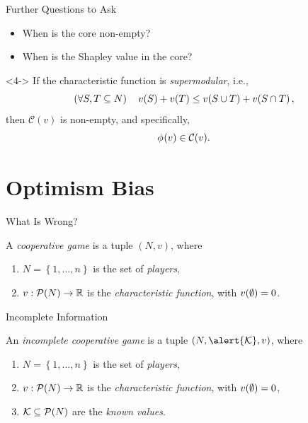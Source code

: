 \documentclass[aspectratio=169]{beamer}
\begin{document}
\begin{frame}{Further Questions to Ask}
	\begin{itemize}[ ]
		\item<2-> When is the core non-empty?
		\item<3-> When is the Shapley value in the core?
	\end{itemize}
	\vspace{1em}
	\begin{theorem}<4->
		If the characteristic function is \emph{supermodular}, i.e., \[
			\left( \forall S,T \subseteq N \right)\quad v\!\left(S\right) + v\!\left(T\right) \leq v\!\left(S \cup T\right) + v\!\left(S \cap T\right),
		\]
		then $ \mathcal{C}(v) $ is non-empty, and specifically, \[
			\phi_{}\!\left(v\right) \in \mathcal{C}(v).
		\]
	\end{theorem}
\end{frame}

\section{Optimism Bias}

\begin{frame}{What Is Wrong?}
	\begin{definition}
		A \emph{cooperative game} is a tuple $ \left( N,v \right) $, where \begin{enumerate}
			\item $ N = \left\{ 1, \ldots, n \right\} $ is the set of \emph{players},
			\item $ v: \mathcal{P}\!\left(N\right) \to \mathbb{R} $ is the \emph{characteristic function}, with $ v\!\left(\emptyset\right) = 0 $.
		\end{enumerate}
	\end{definition}
\end{frame}

\begin{frame}{Incomplete Information}
	\begin{definition}
		An \emph{incomplete cooperative game} is a tuple $ \left( N,\alert{\k},v \right) $, where \begin{enumerate}
			\item $ N = \left\{ 1, \ldots, n \right\} $ is the set of \emph{players},
			\item $ v: \mathcal{P}\!\left(N\right) \to \mathbb{R} $ is the \emph{characteristic function}, with $ v\!\left(\emptyset\right) = 0 $,
			\item \alert{$ \mathcal{K} \subseteq \mathcal{P}\!\left(N\right) $ are the \emph{known values}.}
		\end{enumerate}
	\end{definition}
\end{frame}
\end{document}
